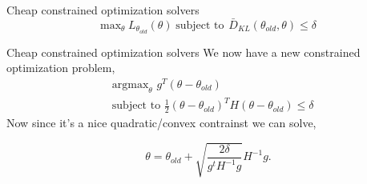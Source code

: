 \documentclass{beamer}
\begin{document}
\begin{frame}{Cheap constrained optimization solvers}
    \begin{equation*}
                \text{max}_{\theta} \hspace{3pt} L_{\theta_{old}}(\theta) \hspace{3pt} 
                 \text{subject to }  \hspace{1pt} \bar{D}_{KL}\left(\theta_{old}, \theta \right) \leq \delta
        \end{equation*}
    
\end{frame}

\begin{frame}{Cheap constrained optimization solvers}
    We now have a new constrained optimization problem, 
    \begin{align*}
        & \text{argmax}_{\theta}\hspace{4pt} g^T (\theta - \theta_{old})  \\
        & \text{subject to  } \frac{1}{2}(\theta - \theta_{old})^TH(\theta - \theta_{old}) \leq \delta
    \end{align*}
Now since it's a nice quadratic/convex contrainst we can solve, 

\begin{equation*}
    \theta = \theta_{old} + \sqrt{\frac{2\delta}{g^tH^{-1}g}} H^{-1}g. 
\end{equation*}
\end{frame}
\end{document}
